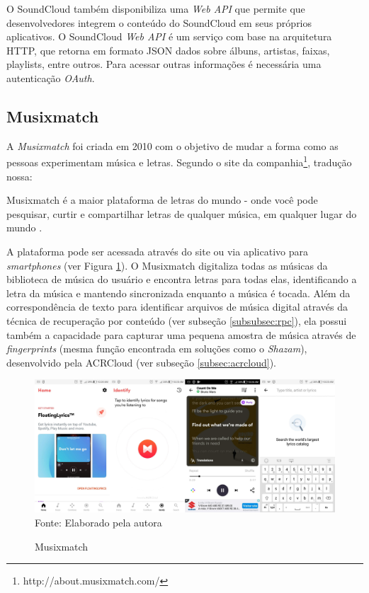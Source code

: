 O SoundCloud também disponibiliza uma \textit{Web API} que permite que desenvolvedores integrem o conteúdo do SoundCloud em seus próprios aplicativos. O SoundCloud \textit{Web API} é um serviço com base na arquitetura HTTP, que retorna em formato JSON dados sobre álbuns, artistas, faixas, playlists, entre outros. Para acessar outras informações é necessária uma autenticação \textit{OAuth}.

\subsection{Musixmatch} \label{subsec:musixmatch}
A \textit{Musixmatch} foi criada em 2010 com o objetivo de mudar a forma como as pessoas experimentam música e letras. Segundo o site da companhia\footnote{http://about.musixmatch.com/}, tradução nossa:

\begin{citacao}
Musixmatch é a maior plataforma de letras do mundo - onde você pode pesquisar, curtir e compartilhar letras de qualquer música, em qualquer lugar do mundo \cite{musixmatch2010}.
\end{citacao}

A plataforma pode ser acessada através do site ou via aplicativo para \textit{smartphones} (ver Figura \ref{fig:musixmatch}). O Musixmatch digitaliza todas as músicas da biblioteca de música do usuário e encontra letras para todas elas, identificando a letra da música e mantendo sincronizada enquanto a música é tocada. Além da correspondência de texto para identificar arquivos de música digital através da técnica de recuperação por conteúdo (ver subseção \ref{subsubsec:rpc}), ela possui também a capacidade para capturar uma pequena amostra de música através de \textit{fingerprints} (mesma função encontrada em soluções como o \textit{Shazam}), desenvolvido pela ACRCloud (ver subseção \ref{subsec:acrcloud}).

\begin{figure}[!htb]
   \centering
   \caption{Musixmatch}\label{fig:musixmatch} 
   \includegraphics[scale=0.12]{figuras/musixmatch.jpg}
   \\Fonte: Elaborado pela autora
\end{figure}

